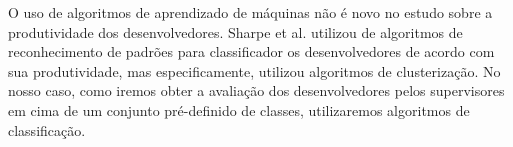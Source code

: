 O uso de algoritmos de aprendizado de máquinas não é novo no estudo sobre a produtividade dos desenvolvedores. Sharpe et al. \cite{Sharpe2005} utilizou de algoritmos de reconhecimento de padrões para classificador os desenvolvedores de acordo com sua produtividade, mas especificamente, utilizou algoritmos de clusterização. No nosso caso, como iremos obter a avaliação dos desenvolvedores pelos supervisores em cima de um conjunto pré-definido de classes, utilizaremos algoritmos de classificação.


